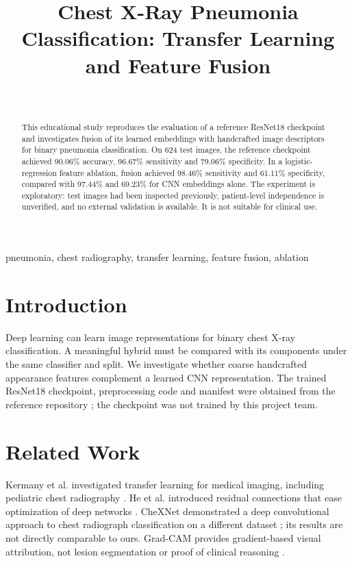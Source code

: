 \documentclass[conference]{IEEEtran}
\begin{document}
\title{Chest X-Ray Pneumonia Classification: Transfer Learning and Feature Fusion}
\author{\\}
\maketitle
\begin{abstract}
This educational study reproduces the evaluation of a reference ResNet18 checkpoint and investigates fusion of its learned embeddings with handcrafted image descriptors for binary pneumonia classification. On 624 test images, the reference checkpoint achieved 90.06\% accuracy, 96.67\% sensitivity and 79.06\% specificity. In a logistic-regression feature ablation, fusion achieved 98.46\% sensitivity and 61.11\% specificity, compared with 97.44\% and 69.23\% for CNN embeddings alone. The experiment is exploratory: test images had been inspected previously, patient-level independence is unverified, and no external validation is available. It is not suitable for clinical use.
\end{abstract}
\begin{IEEEkeywords}pneumonia, chest radiography, transfer learning, feature fusion, ablation\end{IEEEkeywords}
\section{Introduction}
Deep learning can learn image representations for binary chest X-ray classification. A meaningful hybrid must be compared with its components under the same classifier and split. We investigate whether coarse handcrafted appearance features complement a learned CNN representation. The trained ResNet18 checkpoint, preprocessing code and manifest were obtained from the reference repository \cite{repo}; the checkpoint was not trained by this project team.
\section{Related Work}
Kermany et al. investigated transfer learning for medical imaging, including pediatric chest radiography \cite{kermany}. He et al. introduced residual connections that ease optimization of deep networks \cite{resnet}. CheXNet demonstrated a deep convolutional approach to chest radiograph classification on a different dataset \cite{chexnet}; its results are not directly comparable to ours. Grad-CAM provides gradient-based visual attribution, not lesion segmentation or proof of clinical reasoning \cite{gradcam}.
\end{document}
